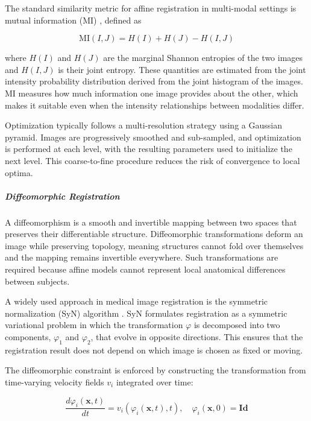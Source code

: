 The standard similarity metric for affine registration in multi-modal settings is mutual information (MI) \cite{maes2002multimodality, mattes2003pet}, defined as

\begin{equation}
	\mathrm{MI}(I, J) = H(I) + H(J) - H(I, J)
	\label{eq:mi}
\end{equation}

where $H(I)$ and $H(J)$ are the marginal Shannon entropies of the two images and $H(I,J)$ is their joint entropy. These quantities are estimated from the joint intensity probability distribution derived from the joint histogram of the images. MI measures how much information one image provides about the other, which makes it suitable even when the intensity relationships between modalities differ.

Optimization typically follows a multi-resolution strategy using a Gaussian pyramid. Images are progressively smoothed and sub-sampled, and optimization is performed at each level, with the resulting parameters used to initialize the next level. This coarse-to-fine procedure reduces the risk of convergence to local optima.

\subparagraph{Diffeomorphic Registration}

A diffeomorphism is a smooth and invertible mapping between two spaces that preserves their differentiable structure. Diffeomorphic transformations deform an image while preserving topology, meaning structures cannot fold over themselves and the mapping remains invertible everywhere. Such transformations are required because affine models cannot represent local anatomical differences between subjects.

A widely used approach in medical image registration is the symmetric normalization (SyN) algorithm \cite{avants_symmetric_2008}. SyN formulates registration as a symmetric variational problem in which the transformation $\varphi$ is decomposed into two components, $\varphi_1$ and $\varphi_2$, that evolve in opposite directions. This ensures that the registration result does not depend on which image is chosen as fixed or moving.

The diffeomorphic constraint is enforced by constructing the transformation from time-varying velocity fields $v_i$ integrated over time:

\begin{equation}
	\frac{d\varphi_i(\mathbf{x}, t)}{dt} = v_i(\varphi_i(\mathbf{x}, t), t),
	\quad \varphi_i(\mathbf{x}, 0) = \mathbf{Id}
	\label{eq:syn_ode}
\end{equation}

